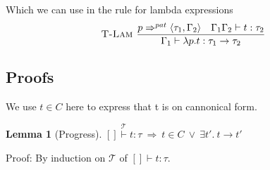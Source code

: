 \documentclass[a4paper]{article}
\newcommand{\im}{\Rightarrow}
\newcommand{\step}{\to}
\newcommand{\patbind}{\Rightarrow^{pat}}
\newcommand{\angled}[1]{\langle #1\rangle}
\newcommand{\T}{\mathcal{T}}
\newcommand{\stackover}[2]{\stackrel{{#2}}{#1}}
\renewcommand{\rule}[3][]{\ \mbox{\textsc{#1 }}\dfrac{#2}{#3}\ }
\newtheorem{lemma}{Lemma}[section]
\begin{document}
Which we can use in the rule for lambda expressions
\[
\rule[T-Lam]{p \patbind \angled{\tau_1,\Gamma_2} \quad \Gamma_1\Gamma_2\vdash t : \tau_2}
{\Gamma_1 \vdash \lambda p.t : \tau_1 \step \tau_2}
\]


\subsection{Proofs}

We use $t \in C$ here to express that t is on cannonical form.

\begin{lemma}[Progress]
\label{lemma:progress}
$\stackover{[]\vdash t:\tau}{\T}\ \im\ t \in C\  \lor\  \exists t'.\ t\step t'$
\end{lemma}

Proof: By induction on $\T$ of $[]\vdash t:\tau$.
\end{document}
